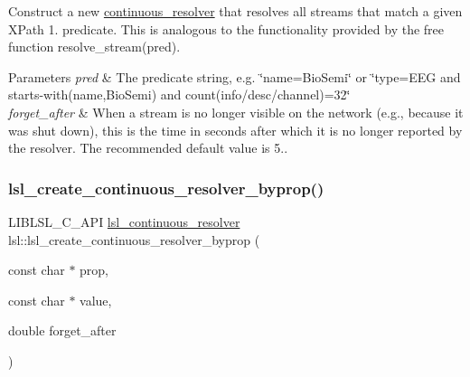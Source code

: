Construct a new \hyperlink{classlsl_1_1continuous__resolver}{continuous\+\_\+resolver} that resolves all streams that match a given X\+Path 1. predicate. This is analogous to the functionality provided by the free function resolve\+\_\+stream(pred). 
\begin{DoxyParams}{Parameters}
{\em pred} & The predicate string, e.\+g. \char`\"{}name=\textquotesingle{}\+Bio\+Semi\textquotesingle{}\char`\"{} or \char`\"{}type=\textquotesingle{}\+E\+E\+G\textquotesingle{} and starts-\/with(name,\textquotesingle{}\+Bio\+Semi\textquotesingle{}) and count(info/desc/channel)=32\char`\"{} \\
\hline
{\em forget\+\_\+after} & When a stream is no longer visible on the network (e.\+g., because it was shut down), this is the time in seconds after which it is no longer reported by the resolver. The recommended default value is 5.. \\
\hline
\end{DoxyParams}
\mbox{\label{namespacelsl_a673d636b9a52467485a9ff6114bcafd6}} 
\subsubsection{\texorpdfstring{lsl\+\_\+create\+\_\+continuous\+\_\+resolver\+\_\+byprop()}{lsl\_create\_continuous\_resolver\_byprop()}}
{\footnotesize\ttfamily L\+I\+B\+L\+S\+L\+\_\+\+C\+\_\+\+A\+PI \hyperlink{namespacelsl_ab09ea0488f986f056322c3c866dc0a0f}{lsl\+\_\+continuous\+\_\+resolver} lsl\+::lsl\+\_\+create\+\_\+continuous\+\_\+resolver\+\_\+byprop (\begin{DoxyParamCaption}\item[{const char $\ast$}]{prop,  }\item[{const char $\ast$}]{value,  }\item[{double}]{forget\+\_\+after }\end{DoxyParamCaption})}

